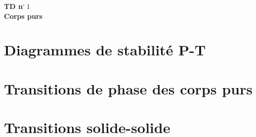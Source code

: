 \documentclass[a4paper]{exam}
\theoremstyle{definition}
\begin{document}
\begin{center}
{\Large \bf TD n$^\circ ~ 1$ \\
Corps purs \\}
\end{center}





%
%
%
%
%
%

\section{Diagrammes de stabilité P-T}





\section{Transitions de phase des corps purs}







%








\section{Transitions solide-solide}
\end{document}
